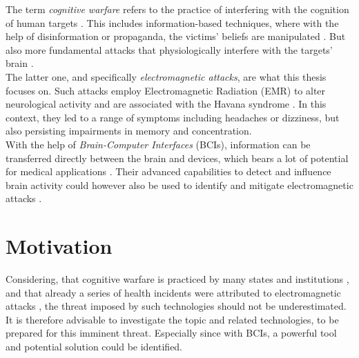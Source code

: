 The term \textit{cognitive warfare} refers to the practice of interfering with the cognition of human targets \cite{Claverie.2022}. This includes information-based techniques, where with the help of disinformation or propaganda, the victims' beliefs are manipulated \cite{Backes.2019}. But also more fundamental attacks that physiologically interfere with the targets' brain \cite{EADS.2023}.\\
The latter one, and specifically \textit{electromagnetic attacks}, are what this thesis focuses on. Such attacks employ Electromagnetic Radiation (EMR) to alter neurological activity and are associated with the Havana syndrome \cite{Pavlin.2020}. In this context, they led to a range of symptoms including headaches or dizziness, but also persisting impairments in memory and concentration.\\
With the help of \textit{Brain-Computer Interfaces} (BCIs), information can be transferred directly between the brain and devices, which bears a lot of potential for medical applications \cite{NicolasAlonso.2012}. Their advanced capabilities to detect and influence brain activity could however also be used to identify and mitigate electromagnetic attacks \cite{Bernal.2021} \cite{Bernal.2023}.


\section{Motivation}
Considering, that cognitive warfare is practiced by many states and institutions \cite{Claverie.2022} \cite{Backes.2019}, and that already a series of health incidents were attributed to electromagnetic attacks \cite{Pavlin.2020}, the threat imposed by such technologies should not be underestimated. It is therefore advisable to investigate the topic and related technologies, to be prepared for this imminent threat. Especially since with BCIs, a powerful tool and potential solution could be identified.


